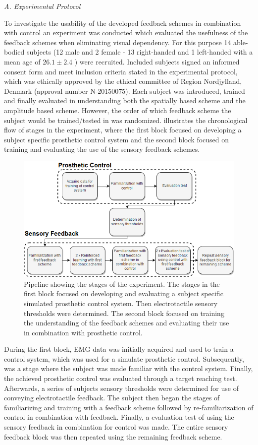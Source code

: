 \textit{A. Experimental Protocol}

To investigate the usability of the developed feedback schemes in combination with control an experiment was conducted which evaluated the usefulness of the feedback schemes when eliminating visual dependency. For this purpose 14 able-bodied subjects (12 male and 2 female - 13 right-handed and 1 left-handed with a mean age of $26.1 \pm 2.4$ ) were recruited. Included subjects signed an informed consent form and meet inclusion criteria stated in the experimental protocol, which was ethically approved by the ethical committee of Region Nordjylland, Denmark (approval number N-20150075). Each subject was introduced, trained and finally evaluated in understanding both the spatially based scheme and the amplitude based scheme. However, the order of which feedback scheme the subject would be trained/tested in was randomized.  illustrates the chronological flow of stages in the experiment, where the first block focused on developing a subject specific prosthetic control system and the second block focused on training and evaluating the use of the sensory feedback schemes. 

\begin{figure}[H]                 
	\includegraphics[width=.47\textwidth]{figures/std_paper}
	\caption{Pipeline showing the stages of the experiment. The stages in the first block focused on developing and evaluating a subject specific simulated prosthetic control system. Then electrotactile sensory thresholds were determined. The second block focused on training the understanding of the feedback schemes and evaluating their use in combination with prosthetic control.}
	\label{fig:pa:std_pap} 
\end{figure}

During the first block, EMG data was initially acquired and used to train a control system, which was used for a simulate prosthetic control. Subsequently, was a stage where the subject was made familiar with the control system. Finally, the achieved prosthetic control was evaluated through a target reaching test. Afterwards, a series of subjects sensory thresholds were determined for use of conveying electrotactile feedback. The subject then began the stages of familiarizing and training with a feedback scheme followed by re-familiarization of control in combination with feedback. Finally, a evaluation test of using the sensory feedback in combination for control was made. The entire sensory feedback block was then repeated using the remaining feedback scheme. 


